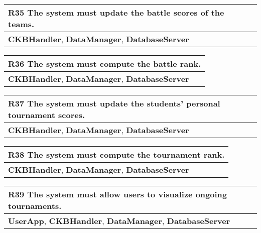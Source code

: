 \begin{table}[H]
    \begin{tabularx}{\textwidth}{X}
        \toprule
        \textbf{R35} The system must update the battle scores of the teams. \\ \midrule
        \textbf{CKBHandler}, \textbf{DataManager}, \textbf{DatabaseServer}                     \\
    \end{tabularx}
\end{table}

\begin{table}[H]
    \begin{tabularx}{\textwidth}{X}
        \toprule
        \textbf{R36} The system must compute the battle rank. \\ \midrule
        \textbf{CKBHandler}, \textbf{DataManager}, \textbf{DatabaseServer}                     \\
    \end{tabularx}
\end{table}

\begin{table}[H]
    \begin{tabularx}{\textwidth}{X}
        \toprule
        \textbf{R37} The system must update the students' personal tournament scores.  \\ \midrule
        \textbf{CKBHandler}, \textbf{DataManager}, \textbf{DatabaseServer}                     \\
    \end{tabularx}
\end{table}

\begin{table}[H]
    \begin{tabularx}{\textwidth}{X}
        \toprule
        \textbf{R38} The system must compute the tournament rank. \\ \midrule
        \textbf{CKBHandler}, \textbf{DataManager}, \textbf{DatabaseServer}                  \\
    \end{tabularx}
\end{table}

\begin{table}[H]
    \begin{tabularx}{\textwidth}{X}
        \toprule
        \textbf{R39} The system must allow users to visualize ongoing tournaments. \\ \midrule
        \textbf{UserApp}, \textbf{CKBHandler}, \textbf{DataManager}, \textbf{DatabaseServer}                    \\
    \end{tabularx}
\end{table}

